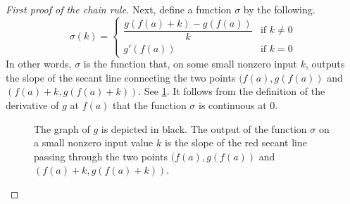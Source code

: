 \begin{proof}[First proof of the chain rule]
	Next, define a function $\sigma$ by the following.  
	\[ \sigma(k) = \begin{cases} \dfrac{g(f(a)+k) - g(f(a))}{k} & \text{if } k \neq 0 \\ g'(f(a)) & \text{if } k = 0 \end{cases} \]
	In other words, $\sigma$ is the function that, on some small nonzero input $k$, outputs the slope of the secant line connecting the two points $(f(a), g(f(a))$ and $(f(a)+k, g(f(a)+k))$. See \cref{slope-function-chain-rule}. It follows from the definition of the derivative of $g$ at $f(a)$ that the function $\sigma$ is continuous at 0. 
	
	\begin{figure}[t]
		\begin{center}
		\end{center}
		\caption{The graph of $g$ is depicted in black. The output of the function $\sigma$ on a small nonzero input value $k$ is the slope of the red secant line passing through the two points $(f(a), g(f(a))$ and $(f(a)+k, g(f(a)+k))$. }  \label{slope-function-chain-rule}
	\end{figure}
	

\end{proof}

